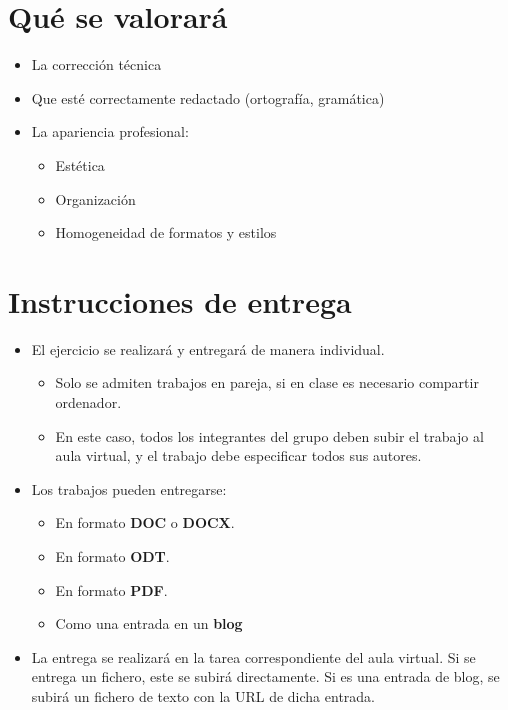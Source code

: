 \clearpage
\section{Qué se valorará}

\begin{itemize}
\item La corrección técnica 
\item Que esté correctamente redactado (ortografía, gramática)
\item La apariencia profesional:
  \begin{itemize}
  \item Estética
  \item Organización
  \item Homogeneidad de formatos y estilos
  \end{itemize}
\end{itemize}

\section{Instrucciones de entrega}
\begin{itemize}
\item El ejercicio se realizará y entregará de manera individual.
  \begin{itemize}
  \item Solo se admiten trabajos en pareja, si en clase es necesario compartir ordenador.
  \item En este caso, todos los integrantes del grupo deben subir el trabajo al aula virtual, y el trabajo debe especificar todos sus autores.
  \end{itemize}

\item Los trabajos pueden entregarse:
  \begin{itemize}
  \item En formato \textbf{DOC} o \textbf{DOCX}.
  \item En formato \textbf{ODT}.
  \item En formato \textbf{PDF}. 
  \item Como una entrada en un \textbf{blog} 

  \end{itemize}
  
\item La entrega se realizará en la tarea correspondiente del aula virtual. Si se entrega un fichero, este se subirá directamente. Si es una entrada de blog, se subirá un fichero de texto con la URL de dicha entrada.
\end{itemize}  


\begin{comment}
\url{https://networkengineering.stackexchange.com/questions/5300/what-is-the-difference-between-ethernet-ii-and-802-3-ethernet}
\url{https://en.wikipedia.org/wiki/IEEE_802.3}
\end{comment}



